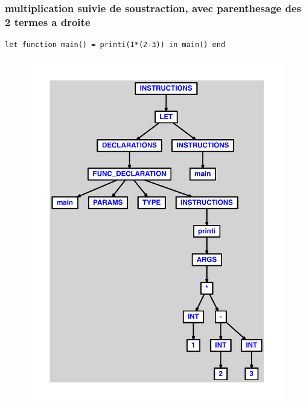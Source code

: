 \documentclass{article}
\begin{document}
\subsubsection{multiplication suivie de soustraction, avec parenthesage des 2 termes a droite}
\begin{lstlisting}
let function main() = printi(1*(2-3)) in main() end
\end{lstlisting}
\newpage
\begin{figure}[H]
\centering
\includegraphics[max width=\textwidth]{ast/ast_92.pdf}
\end{figure}
\newpage
\end{document}
